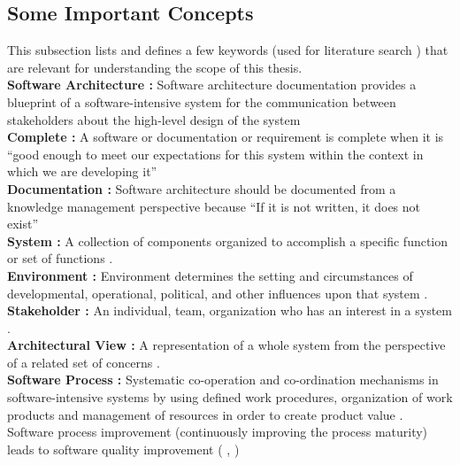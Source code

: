 \subsection{Some Important Concepts}
\indent This subsection lists and defines a few keywords (used for literature search ) that are relevant for understanding the scope of this thesis.
\newline
\\\indent \textbf{Software Architecture : } Software architecture documentation provides a blueprint of a software-intensive system for the communication between stakeholders about the high-level design of the system \cite{6923128}
\newline
\\\indent \textbf{Complete : } A software or documentation or requirement is complete when it is \enquote{good enough to meet our expectations for this system within the context in which we are developing it}  \cite{BachmannDocumentingSoftware2010}
\newline
\\\indent \textbf{Documentation : } Software architecture should be documented from a knowledge management perspective because \enquote{If it is not written, it does not exist} \cite{bab2009}
\newline
\\\indent \textbf{System : }A collection of components organized to accomplish a specific function or set of functions \cite{Standard2007}.
\newline
\\\indent \textbf{Environment : }Environment determines the setting and circumstances of developmental, operational, political, and other influences upon that system \cite{Standard2007}. 
\newline
\\\indent \textbf{Stakeholder : } An individual, team, organization who has an interest in a system \cite{Standard2007}.
\newline
\\\indent \textbf{Architectural View : } A representation of a whole system from the perspective of a related set of concerns \cite{Standard2007}.
\newline
\\\indent \textbf{Software Process : } Systematic co-operation and co-ordination mechanisms in software-intensive systems by using defined work procedures, organization of work products and management of resources in order to create product value \cite{munch2012software}.
\\\indent Software process improvement (continuously improving the process maturity) leads to software quality improvement ( \cite{Fuggeffa1988}, \cite{Lavallee2011} )


